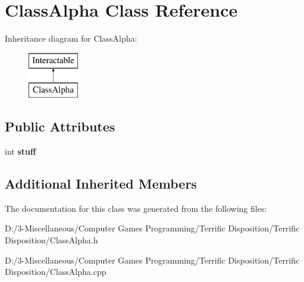 \hypertarget{class_class_alpha}{}\section{Class\+Alpha Class Reference}
\label{class_class_alpha}
Inheritance diagram for Class\+Alpha\+:\begin{figure}[H]
\begin{center}
\leavevmode
\includegraphics[height=2.000000cm]{class_class_alpha}
\end{center}
\end{figure}
\subsection*{Public Attributes}
\begin{DoxyCompactItemize}
\item 
\mbox{\label{class_class_alpha_a295111f0e80d303f27e39a8a263baf89}} 
int {\bfseries stuff}
\end{DoxyCompactItemize}
\subsection*{Additional Inherited Members}


The documentation for this class was generated from the following files\+:\begin{DoxyCompactItemize}
\item 
D\+:/3-\/\+Miscellaneous/\+Computer Games Programming/\+Terrific Disposition/\+Terrific Disposition/Class\+Alpha.\+h\item 
D\+:/3-\/\+Miscellaneous/\+Computer Games Programming/\+Terrific Disposition/\+Terrific Disposition/Class\+Alpha.\+cpp\end{DoxyCompactItemize}
